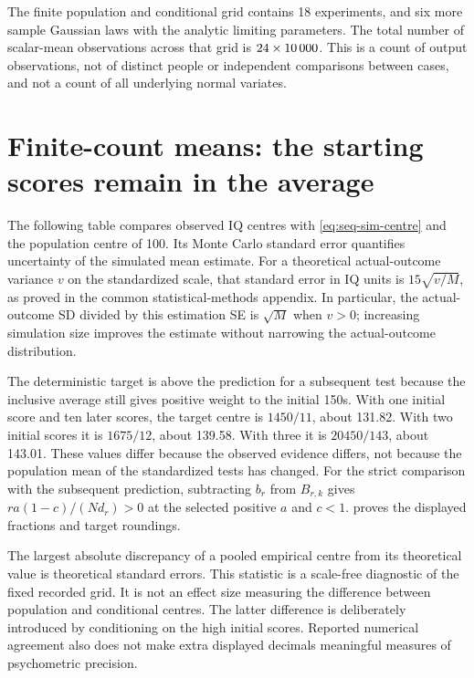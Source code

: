 The finite population and conditional grid contains 18 experiments, and
six more sample Gaussian laws with the analytic limiting parameters.
The total number of scalar-mean observations across that grid is
\(24\times10\,000\). This is a count of output observations,
not of distinct people or independent comparisons between cases, and not
a count of all underlying normal variates.

\chapter{Finite-count means: the starting scores remain in the average}
\label{sec:seq-sim-means}

The following table compares observed IQ centres with
\eqref{eq:seq-sim-centre} and the population centre of 100. Its Monte Carlo
standard error quantifies uncertainty of the simulated mean estimate.
For a theoretical actual-outcome variance \(v\) on the standardized
scale, that standard error in IQ units is \(15\sqrt{v/M}\), as proved
in the common statistical-methods appendix.
In particular, the actual-outcome SD divided by this estimation SE is
\(\sqrt M\) when \(v>0\); increasing simulation size improves the
estimate without narrowing the actual-outcome distribution.



The deterministic target is above the prediction for a subsequent test
because the inclusive average still gives positive weight to the initial
150s. With one initial score and ten later scores, the target centre is
\(1450/11\), about 131.82. With two initial scores it is
\(1675/12\), about 139.58. With three it is \(20450/143\), about 143.01.
These values differ because the observed evidence differs, not because
the population mean of the standardized tests has changed.
For the strict comparison with the subsequent prediction, subtracting
\(b_r\) from \(B_{r,k}\) gives
\(ra(1-c)/(Nd_r)>0\) at the selected positive \(a\) and \(c<1\).
 proves the displayed fractions and target
roundings.

The largest absolute discrepancy of a pooled empirical centre from its
theoretical value is \SimMaxMeanSE{} theoretical standard errors. This
statistic is a scale-free diagnostic of the fixed recorded grid. It is
not an effect size measuring the difference between population and
conditional centres. The latter difference is deliberately introduced by
conditioning on the high initial scores. Reported numerical agreement
also does not make extra displayed decimals meaningful measures of
psychometric precision.

